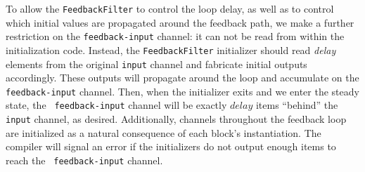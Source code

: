 To allow the {\tt FeedbackFilter} to control the loop delay, as well
as to control which initial values are propagated around the feedback
path, we make a further restriction on the {\tt feedback-input}
channel: it can not be read from within the initialization code.
Instead, the {\tt FeedbackFilter} initializer should read {\it delay}
elements from the original {\tt input} channel and fabricate initial
outputs accordingly.  These outputs will propagate around the loop and
accumulate on the {\tt feedback-input} channel.  Then, when the
initializer exits and we enter the steady state, the {\tt
feedback-input} channel will be exactly $delay$ items ``behind'' the
{\tt input} channel, as desired.  Additionally, channels throughout
the feedback loop are initialized as a natural consequence of each
block's instantiation.  The compiler will signal an error if the
initializers do not output enough items to reach the {\tt
feedback-input} channel.


